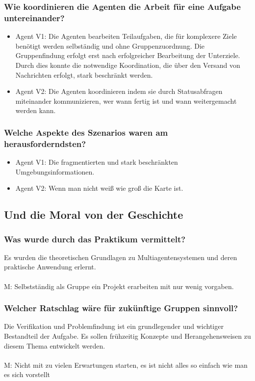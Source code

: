 \documentclass[runningheads]{llncs}
\begin{document}
\subsubsection{Wie koordinieren die Agenten die Arbeit für eine Aufgabe untereinander?}
\begin{itemize}
\item Agent V1: Die Agenten bearbeiten Teilaufgaben, die für komplexere Ziele benötigt werden selbständig und ohne Gruppenzuordnung. Die Gruppenfindung erfolgt erst nach erfolgreicher Bearbeitung der Unterziele. Durch dies konnte die notwendige Koordination, die über den Versand von Nachrichten erfolgt, stark beschränkt werden.
\item Agent V2: Die Agenten koordinieren indem sie durch Statusabfragen miteinander kommunizieren, wer wann fertig ist und wann weitergemacht werden kann.
\end{itemize}

\subsubsection{Welche Aspekte des Szenarios waren am herausforderndsten?}
\begin{itemize}
\item Agent V1: Die fragmentierten und stark beschränkten Umgebungsinformationen. 
\item Agent V2: Wenn man nicht weiß wie groß die Karte ist.
\end{itemize}

\subsection{Und die Moral von der Geschichte}
\subsubsection{Was wurde durch das Praktikum vermittelt?\\}
Es wurden die theoretischen Grundlagen zu Multiagentensystemen und deren praktische Anwendung erlernt. \\
\\
M: Selbstständig als Gruppe ein Projekt erarbeiten mit nur wenig vorgaben.
\subsubsection{Welcher Ratschlag wäre für zukünftige Gruppen sinnvoll?\\}
Die Verifikation und Problemfindung ist ein grundlegender und wichtiger Bestandteil der Aufgabe. Es sollen frühzeitig Konzepte und Herangehensweisen zu diesem Thema entwickelt werden. \\ 
\\
M: Nicht mit zu vielen Erwartungen starten, es ist nicht alles so einfach wie man es sich vorstellt
\end{document}

